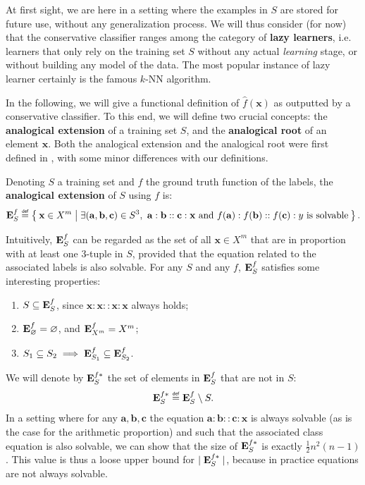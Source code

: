 At first sight, we are here in a setting where the examples in $S$ are stored
for future use, without any generalization process.  We will thus consider (for
now) that the conservative classifier ranges among the category of
\textbf{lazy learners}, i.e. learners that only rely on the training set $S$
without any actual \textit{learning} stage, or without building any model of
the data. The most popular instance of lazy learner certainly is the famous
$k$-NN algorithm.

In the following, we will give a functional definition of $\hat{f}(\mathbf{x})$
as outputted by a conservative classifier. To this end, we will define two
crucial concepts: the \textbf{analogical extension} of a training set $S$, and
the \textbf{analogical root} of an element $\mathbf{x}$. Both the analogical
extension and the analogical root were first defined in \cite{StrYvoREPORT05},
with some minor differences with our definitions.

\begin{definition}
  \label{DEF:analogical_extension}
  Denoting $S$ a training set and $f$ the ground truth function of the labels,
  the \textbf{analogical extension} of $S$ using $f$ is:
  $$
  \esf \eqdef \Set{ \mathbf{x} \in X^m |  \exists
  (\mathbf{a},\mathbf{b},\mathbf{c}) \in S^3, ~ \mathbf{a} : \mathbf{b} ::
  \mathbf{c} : \mathbf{x} \text{ and } f(\mathbf{a}) : f(\mathbf{b}) ::
  f(\mathbf{c}) : y \text{ is solvable}}.
  $$
\end{definition}

Intuitively,  $\mathbf{E}_{S}^{f}$ can be regarded as the set of all $\mathbf{x} \in X^m$
that are in proportion with at least one 3-tuple in $S$, provided that the
equation related to the associated labels is also solvable. For any $S$ and any
$f$, $\mathbf{E}_{S}^{f}$ satisfies some interesting properties: \begin{enumerate}
\item $S \subseteq \mathbf{E}_{S}^{f}$, since $\mathbf{x} : \mathbf{x} :: \mathbf{x}
  :\mathbf{x}$ always holds;
\item $\mathbf{E}_{\varnothing}^{f} = \varnothing$, and $\mathbf{E}_{X^m}^{f}=X^m$;
\item $S_1 \subseteq S_2 \implies \mathbf{E}_{S_1}^{f} \subseteq \mathbf{E}_{S_2}^{f}$.
\end{enumerate}
We will denote by $\mathbf{E}_{S}^{f*}$ the set of elements in $\mathbf{E}_{S}^{f}$ that are not in $S$:
$$\esfs \eqdef \esf \setminus S.$$ In a setting where for any
$\mathbf{a},\mathbf{b}, \mathbf{c}$ the equation $\mathbf{a} : \mathbf{b} ::
\mathbf{c} : \mathbf{x}$ is always solvable (as is the case for the arithmetic
proportion) and such that the associated class equation is also solvable, we
can show that the size of $\mathbf{E}_{S}^{f*}$ is exactly $\frac{1}{2} n^2(n - 1)$. This
value is thus a loose upper bound for $\mid \mathbf{E}_{S}^{f*}\mid$, because in practice
equations are not always solvable.

